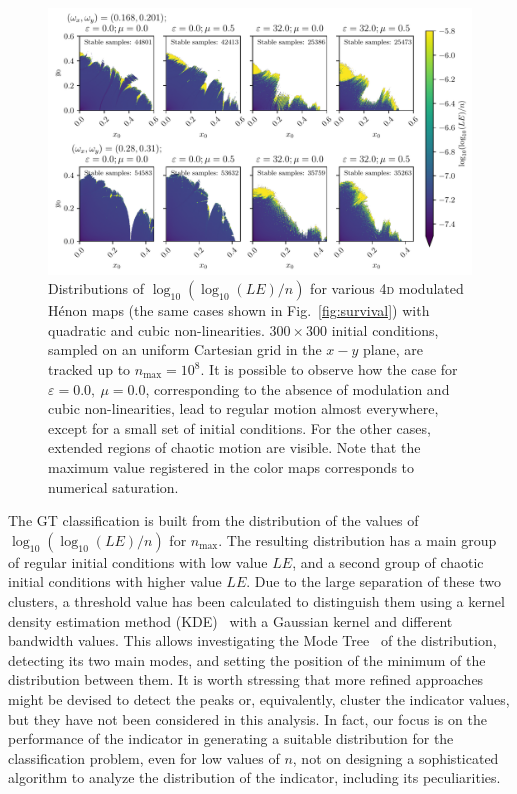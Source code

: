 \begin{figure}[htp]
    \centering
    \includegraphics[width=\textwidth]{6_dynamic_indicators/fig/gt_example_colormap.pdf}
    \caption{Distributions of $\log_{10}(\log_{10}(LE)/n)$ for various 4\textsc{d} modulated Hénon maps (the same cases shown in Fig.~\ref{fig:survival}) with quadratic and cubic non-linearities. $300\times300$ initial conditions, sampled on an uniform Cartesian grid in the $x-y$ plane, are tracked up to $n_\text{max}=10^8$. It is possible to observe how the case for $\varepsilon=0.0,\ \mu=0.0$, corresponding to the absence of modulation and cubic non-linearities, lead to regular motion almost everywhere, except for a small set of initial conditions. For the other cases, extended regions of chaotic motion are visible. Note that the maximum value registered in the color maps corresponds to numerical saturation.}
    \label{fig:ground_truth_bis}
\end{figure}

The GT classification is built from the distribution of the values of $\log_{10}(\log_{10}(LE)/n)$ for $n_\text{max}$. The resulting distribution has a main group of regular initial conditions with low value $LE$, and a second group of chaotic initial conditions with higher value $LE$. Due to the large separation of these two clusters, a threshold value has been calculated to distinguish them using a kernel density estimation method (KDE)~\cite{doi:10.1080/24709360.2017.1396742, refId0} with a Gaussian kernel and different bandwidth values. This allows investigating the Mode Tree~\cite{10.2307/1390955} of the distribution, detecting its two main modes, and setting the position of the minimum of the distribution between them. It is worth stressing that more refined approaches might be devised to detect the peaks or, equivalently, cluster the indicator values, but they have not been considered in this analysis. In fact, our focus is on the performance of the indicator in generating a suitable distribution for the classification problem, even for low values of $n$, not on designing a sophisticated algorithm to analyze the distribution of the indicator, including its peculiarities.

